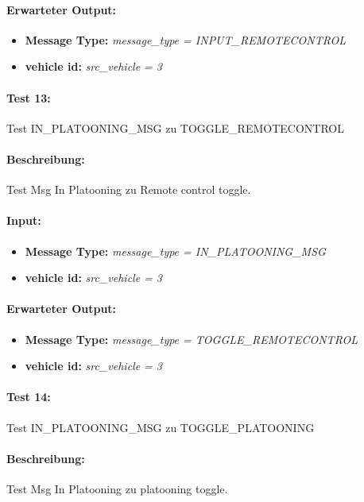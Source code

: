 \documentclass[a4paper, 12pt, titlepage]{scrartcl}
\begin{document}
{			\paragraph{Erwarteter Output:}
			\begin{itemize} \itemsep-0.5em
				\item \textbf{Message Type:} \emph{message\_type = INPUT\_REMOTECONTROL}
				\item \textbf{vehicle id:} \emph{src\_vehicle = 3}
			\end{itemize}

			\paragraph{Test 13:}{Test IN\_PLATOONING\_MSG zu TOGGLE\_REMOTECONTROL}
			\paragraph{Beschreibung:} Test Msg In Platooning zu Remote control toggle.
			\paragraph{Input:}
			\begin{itemize} \itemsep-0.5em
				\item \textbf{Message Type:} \emph{message\_type = IN\_PLATOONING\_MSG}
				\item \textbf{vehicle id:} \emph{src\_vehicle = 3}
			\end{itemize}
			\paragraph{Erwarteter Output:}
			\begin{itemize} \itemsep-0.5em
				\item \textbf{Message Type:} \emph{message\_type = TOGGLE\_REMOTECONTROL}
				\item \textbf{vehicle id:} \emph{src\_vehicle = 3}
			\end{itemize}

			\paragraph{Test 14:}{Test IN\_PLATOONING\_MSG zu TOGGLE\_PLATOONING}
			\paragraph{Beschreibung:} Test Msg In Platooning zu platooning toggle.
}
\end{document}
